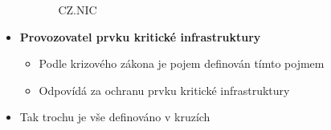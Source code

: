 \begin{itemize}
\begin{itemize}
\begin{itemize}
                              CZ.NIC
                    \end{itemize}
          \end{itemize}
          \item \textbf{Provozovatel prvku kritické infrastruktury}
          \begin{itemize}
              \item Podle krizového zákona je pojem  definován tímto pojmem
              \item Odpovídá za ochranu prvku kritické infrastruktury
          \end{itemize}
          \item Tak trochu je vše definováno v kruzích
\end{itemize}



